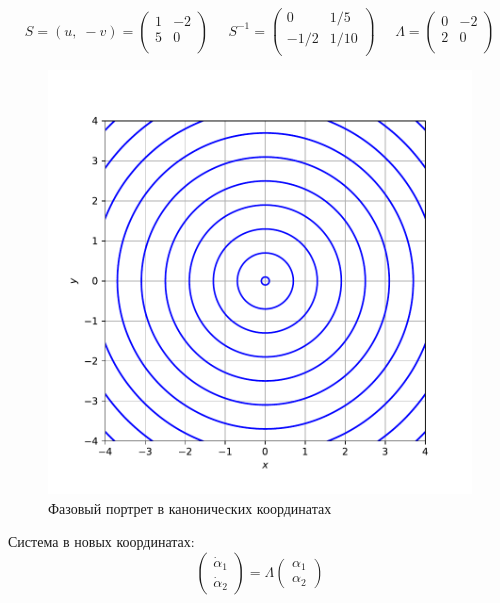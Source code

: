 \documentclass[a4paper, 12pt]{article}
\begin{document}
\[
S = (u, \;-v) = \left(
\begin{array}{cc}
1 & -2\\
5 & 0\\
\end{array}
\right)\;\;\;\;\;
S^{-1} = \left(
\begin{array}{cc}
0 & 1/5\\
-1/2 & 1/10\\
\end{array}\right)\;\;\;\;\;
\Lambda = \left(
\begin{array}{cc}
0 & -2\\
2 & 0\\
\end{array}\right)
\]
\begin{figure}[H]
	\centering
	\includegraphics[scale=0.7]{3a1_0}
	\caption{Фазовый портрет в канонических координатах}
	\label{im:1a1_0}
\end{figure}
Система в новых координатах:
\[\left(
\begin{array}{c}
\dot{\alpha}_1\\
\dot{\alpha}_2
\end{array}
\right)=\Lambda\left(
\begin{array}{c}
{\alpha}_1 \\
{\alpha}_2
\end{array}
\right)\]
\end{document}
